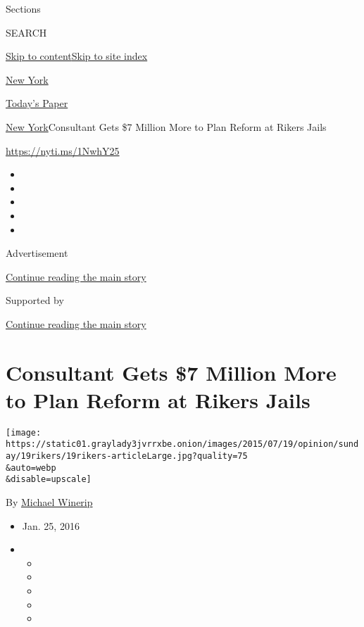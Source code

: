 Sections

SEARCH

\protect\hyperlink{site-content}{Skip to
content}\protect\hyperlink{site-index}{Skip to site index}

\href{https://www.nytimes3xbfgragh.onion/section/nyregion}{New York}

\href{https://myaccount.nytimes3xbfgragh.onion/auth/login?response_type=cookie\&client_id=vi}{}

\href{https://www.nytimes3xbfgragh.onion/section/todayspaper}{Today's
Paper}

\href{/section/nyregion}{New York}\textbar{}Consultant Gets \$7 Million
More to Plan Reform at Rikers Jails

\url{https://nyti.ms/1NwhY25}

\begin{itemize}
\item
\item
\item
\item
\item
\end{itemize}

Advertisement

\protect\hyperlink{after-top}{Continue reading the main story}

Supported by

\protect\hyperlink{after-sponsor}{Continue reading the main story}

\hypertarget{consultant-gets-7-million-more-to-plan-reform-at-rikers-jails}{%
\section{Consultant Gets \$7 Million More to Plan Reform at Rikers
Jails}\label{consultant-gets-7-million-more-to-plan-reform-at-rikers-jails}}

\texttt{[image: https://static01.graylady3jvrrxbe.onion/images/2015/07/19/opinion/sunday/19rikers/19rikers-articleLarge.jpg?quality=75\\\&auto=webp\\\&disable=upscale]}

By \href{http://www.nytimes3xbfgragh.onion/by/michael-winerip}{Michael
Winerip}

\begin{itemize}
\item
  Jan. 25, 2016
\item
  \begin{itemize}
  \item
  \item
  \item
  \item
  \item
  \end{itemize}
\end{itemize}

